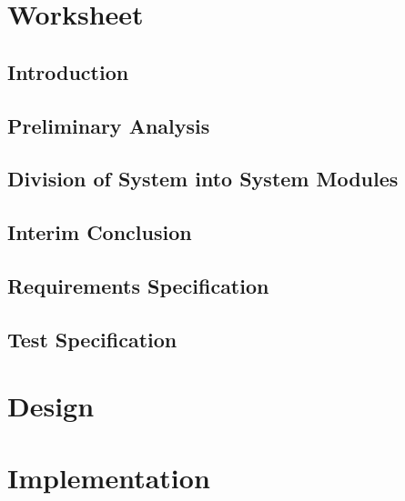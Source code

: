 





\pagestyle{empty}


\pagestyle{fancy}
\setcounter{page}{1}

\tableofcontents
\cleardoublepage
\setcounter{page}{1}



\part{Worksheet}
    \chapter{Introduction} \label{cha:introduction}
        
    \chapter{Preliminary Analysis} \label{cha:preliminary_analysis}
    \chapter{Division of System into System Modules}
    \chapter{Interim Conclusion}
    \chapter{Requirements Specification} \label{cha:requirements}
    \chapter{Test Specification}
    
\part{Design}
\part{Implementation}








